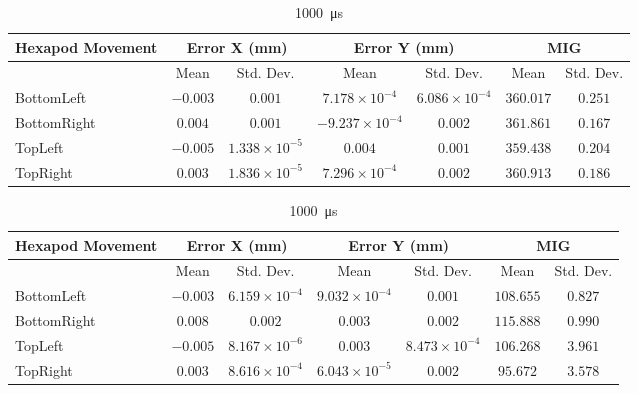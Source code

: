 \begin{table}[h]
    \vspace{10pt}

    \begin{subtable}{\textwidth}
        \centering
        \footnotesize
        \begin{tabular}{lcccccc}
            \toprule
            Hexapod Movement & \multicolumn{2}{c}{Error X (mm)} & \multicolumn{2}{c}{Error Y (mm)} & \multicolumn{2}{c}{MIG}  \\
            \midrule
            & \multicolumn{1}{c}{Mean} & \multicolumn{1}{c}{Std. Dev.} & \multicolumn{1}{c}{Mean} & \multicolumn{1}{c}{Std. Dev.} & \multicolumn{1}{c}{Mean} & \multicolumn{1}{c}{Std. Dev.} \\
            \midrule
            \textsf{BottomLeft} & $-0.003$ & $0.001$ & $7.178\times10^{-4}$ & $6.086\times10^{-4}$ & $360.017$ & $0.251$ \\
            \textsf{BottomRight} & $0.004$ & $0.001$ & $-9.237\times10^{-4}$ & $0.002$ & $361.861$ & $0.167$ \\
            \textsf{TopLeft} & $-0.005$ & $1.338\times10^{-5}$ & $0.004$ & $0.001$ & $359.438$ & $0.204$ \\
            \textsf{TopRight} & $0.003$ & $1.836\times10^{-5}$ & $7.296\times10^{-4}$ & $0.002$ & $360.913$ & $0.186$ \\
            \bottomrule
        \end{tabular}
        \caption{\SI{320}{\micro\second}}
    \end{subtable}

    \vspace{10pt}

    \begin{subtable}{\textwidth}
        \centering
        \footnotesize
        \begin{tabular}{lcccccc}
            \toprule
            Hexapod Movement & \multicolumn{2}{c}{Error X (mm)} & \multicolumn{2}{c}{Error Y (mm)} & \multicolumn{2}{c}{MIG}  \\
            \midrule
            & \multicolumn{1}{c}{Mean} & \multicolumn{1}{c}{Std. Dev.} & \multicolumn{1}{c}{Mean} & \multicolumn{1}{c}{Std. Dev.} & \multicolumn{1}{c}{Mean} & \multicolumn{1}{c}{Std. Dev.} \\
            \midrule
            \textsf{BottomLeft} & $-0.003$ & $6.159\times10^{-4}$ & $9.032\times10^{-4}$ & $0.001$ & $108.655$ & $0.827$ \\
            \textsf{BottomRight} & $0.008$ & $0.002$ & $0.003$ & $0.002$ & $115.888$ & $0.990$ \\
            \textsf{TopLeft} & $-0.005$ & $8.167\times10^{-6}$ & $0.003$ & $8.473\times10^{-4}$ & $106.268$ & $3.961$ \\
            \textsf{TopRight} & $0.003$ & $8.616\times10^{-4}$ & $6.043\times10^{-5}$ & $0.002$ & $95.672$ & $3.578$ \\
            \bottomrule
        \end{tabular}
        \caption{\SI{1000}{\micro\second}}
    \end{subtable}


\end{table}
